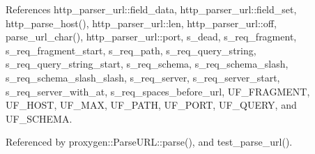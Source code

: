 References http\+\_\+parser\+\_\+url\+::field\+\_\+data, http\+\_\+parser\+\_\+url\+::field\+\_\+set, http\+\_\+parse\+\_\+host(), http\+\_\+parser\+\_\+url\+::len, http\+\_\+parser\+\_\+url\+::off, parse\+\_\+url\+\_\+char(), http\+\_\+parser\+\_\+url\+::port, s\+\_\+dead, s\+\_\+req\+\_\+fragment, s\+\_\+req\+\_\+fragment\+\_\+start, s\+\_\+req\+\_\+path, s\+\_\+req\+\_\+query\+\_\+string, s\+\_\+req\+\_\+query\+\_\+string\+\_\+start, s\+\_\+req\+\_\+schema, s\+\_\+req\+\_\+schema\+\_\+slash, s\+\_\+req\+\_\+schema\+\_\+slash\+\_\+slash, s\+\_\+req\+\_\+server, s\+\_\+req\+\_\+server\+\_\+start, s\+\_\+req\+\_\+server\+\_\+with\+\_\+at, s\+\_\+req\+\_\+spaces\+\_\+before\+\_\+url, U\+F\+\_\+\+F\+R\+A\+G\+M\+E\+NT, U\+F\+\_\+\+H\+O\+ST, U\+F\+\_\+\+M\+AX, U\+F\+\_\+\+P\+A\+TH, U\+F\+\_\+\+P\+O\+RT, U\+F\+\_\+\+Q\+U\+E\+RY, and U\+F\+\_\+\+S\+C\+H\+E\+MA.



Referenced by proxygen\+::\+Parse\+U\+R\+L\+::parse(), and test\+\_\+parse\+\_\+url().


